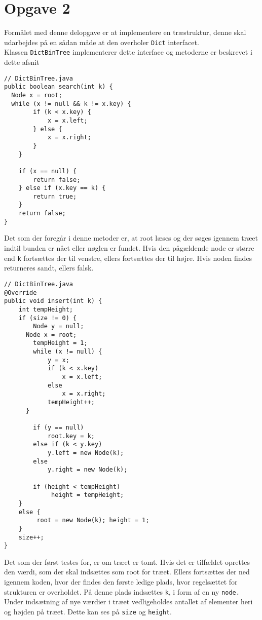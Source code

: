 \documentclass{article}
\begin{document}
\section*{Opgave 2}
Formålet med denne delopgave er at implementere en træstruktur, denne skal udarbejdes på en sådan måde at den overholer \texttt{Dict} interfacet.\\
Klassen \texttt{DictBinTree} implementerer dette interface og metoderne er beskrevet i dette afsnit
\begin{lstlisting}
// DictBinTree.java
public boolean search(int k) {
  Node x = root;
  while (x != null && k != x.key) {
        if (k < x.key) {
            x = x.left;
        } else {
            x = x.right;
        }
    }

    if (x == null) {
        return false;
    } else if (x.key == k) {
        return true;
    }
    return false;
}
\end{lstlisting}
\bigskip
Det som der foregår i denne metoder er, at root læses og der søges igennem træet indtil bunden er nået eller nøglen er fundet. Hvis den pågældende node er større end \texttt{k} fortsættes der til venstre, ellers fortsættes der til højre. Hvis noden findes returneres sandt, ellers falsk.\\
\newpage
\begin{lstlisting}
// DictBinTree.java
@Override
public void insert(int k) {
	int tempHeight;
	if (size != 0) {
		Node y = null;
      Node x = root;
		tempHeight = 1;
		while (x != null) {
			y = x;
			if (k < x.key)
				x = x.left;
			else
				x = x.right;			
			tempHeight++;
      }
		
		if (y == null)
			root.key = k;
		else if (k < y.key)
			y.left = new Node(k);
		else
			y.right = new Node(k);		
            
		if (height < tempHeight)
			 height = tempHeight;		
	}
	else {
		 root = new Node(k); height = 1;
	}
	size++;
}
\end{lstlisting}
\bigskip
Det som der først testes for, er om træet er tomt. Hvis det er tilfældet oprettes den værdi, som der skal indsættes som root for træet. Ellers fortsættes der ned igennem koden, hvor der findes den første ledige plads, hvor regelsættet for strukturen er overholdet. På denne plads indsættes \texttt{k}, i form af en ny \texttt{node.}\\
Under indsætning af nye værdier i træet vedligeholdes antallet af elementer heri og højden på træet. Dette kan ses på \texttt{size} og \texttt{height}.
\newpage
\end{document}
